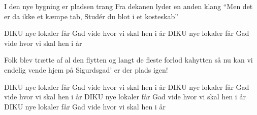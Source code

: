 \documentclass[a4paper,11pt]{article}
\begin{document}
\begin{song}
   I den nye bygning er pladsen trang
             Fra dekanen lyder en anden klang
   ``Men det er da ikke et kæmpe tab,
             Studér du blot i et kosteskab''


   DIKU nye lokaler får
                Gad vide hvor vi skal hen i år
   DIKU nye lokaler får
               Gad vide hvor vi skal hen i år

   Folk blev trætte af al den flytten
             og langt de fleste forlod kahytten
   så nu kan vi endelig vende hjem
             på Sigurdsgad' er der plads igen!

   DIKU nye lokaler får
                Gad vide hvor vi skal hen i år
   DIKU nye lokaler får
               Gad vide hvor vi skal hen i år
   DIKU nye lokaler får
               Gad vide hvor vi skal hen i år
   DIKU nye lokaler får
               Gad vide hvor vi skal hen i år

\end{song}
\end{document}
